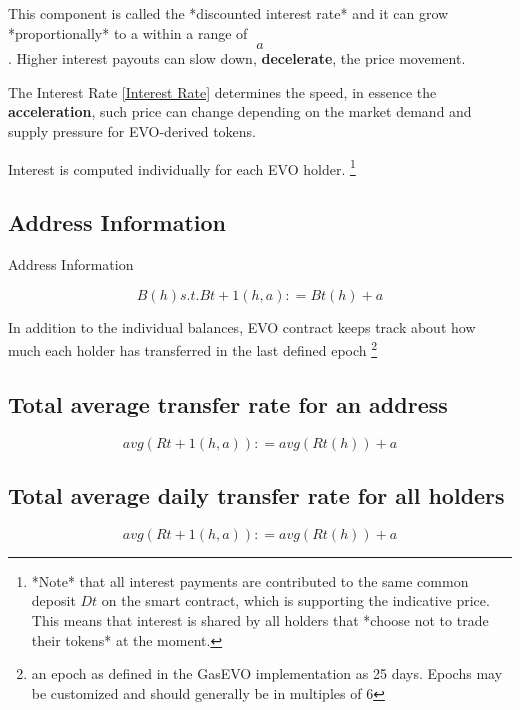 This component is called the *discounted interest rate* and it can grow *proportionally* to a within a range of 
\begin{equation}
 [0, 0.24] a 
\end{equation}
.
Higher interest payouts can slow down, \textbf{decelerate}, the price movement. 

The Interest Rate \ref{Interest Rate} determines the speed, in essence the \textbf{acceleration}, such price can change depending on the market demand and supply pressure for EVO-derived tokens.

Interest is computed individually for each EVO holder. \footnote{
*Note* that all interest payments are contributed to the same common deposit $Dt$ on the smart contract, which is supporting the indicative price. This means that interest is shared by all holders that *choose not to trade their tokens* at the moment.}




\label{sec:Calculations}
\subsection{Address Information}
Address Information


\begin{equation}
B(h) s.t. Bt + 1(h, a): = Bt(h) + a 
\end{equation}


In addition to the individual balances, EVO contract keeps track about how much each holder has transferred in the last defined epoch \footnote{an epoch as defined in the GasEVO implementation as 25 days. Epochs may be customized and should generally be in multiples of 6}

\label{sec:Calculations}
\subsection{Total average transfer rate for an address}

\begin{equation}
avg(Rt + 1(h, a)): = avg(Rt(h)) + a
\end{equation}


\label{sec:Calculations}
\subsection{Total average daily transfer rate for all holders}
\begin{equation}
avg(Rt + 1(h, a)): = avg(Rt(h)) + a
\end{equation}

